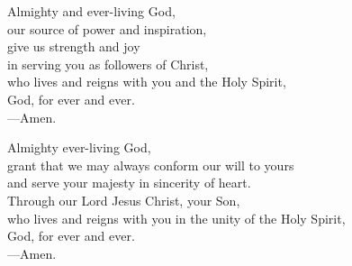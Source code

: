 \prayer


\begin{prayerverse}
Almighty and ever-living God,\\
our source of power and inspiration,\\
give us strength and joy\\
in serving you as followers of Christ,\\
who lives and reigns with you and the Holy Spirit,\\
God, for ever and ever.\\
{\color{red}---\thinspace}Amen.
\end{prayerverse}


\begin{prayerverse}
Almighty ever-living God,\\
grant that we may always conform our will to yours\\
and serve your majesty in sincerity of heart.\\
Through our Lord Jesus Christ, your Son,\\
who lives and reigns with you in the unity of the Holy Spirit,\\
God, for ever and ever.\\
{\color{red}---\thinspace}Amen.
\end{prayerverse}

